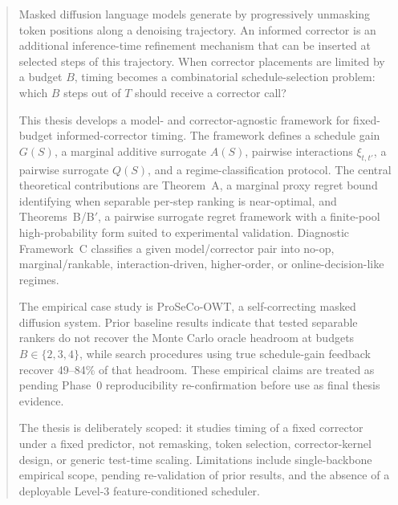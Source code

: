 \begin{abstract}
Masked diffusion language models generate by progressively unmasking token
positions along a denoising trajectory. An informed corrector is an additional
inference-time refinement mechanism that can be inserted at selected steps of
this trajectory. When corrector placements are limited by a budget $B$, timing
becomes a combinatorial schedule-selection problem: which $B$ steps out of $T$
should receive a corrector call?

This thesis develops a model- and corrector-agnostic framework for fixed-budget
informed-corrector timing. The framework defines a schedule gain $G(S)$, a
marginal additive surrogate $A(S)$, pairwise interactions $\xi_{t,t'}$, a
pairwise surrogate $Q(S)$, and a regime-classification protocol. The central
theoretical contributions are Theorem~A, a marginal proxy regret bound
identifying when separable per-step ranking is near-optimal, and
Theorems~B/B$'$, a pairwise surrogate regret framework with a finite-pool
high-probability form suited to experimental validation. Diagnostic
Framework~C classifies a given model/corrector pair into no-op,
marginal/rankable, interaction-driven, higher-order, or online-decision-like
regimes.

The empirical case study is ProSeCo-OWT, a self-correcting masked diffusion
system. Prior baseline results indicate that tested separable rankers do not
recover the Monte Carlo oracle headroom at budgets $B\in\{2,3,4\}$, while
search procedures using true schedule-gain feedback recover 49--84\% of
that headroom. These empirical claims are treated as pending Phase~0
reproducibility re-confirmation before use as final thesis evidence.

The thesis is deliberately scoped: it studies timing of a fixed corrector
under a fixed predictor, not remasking, token selection, corrector-kernel
design, or generic test-time scaling. Limitations include single-backbone
empirical scope, pending re-validation of prior results, and the absence of
a deployable Level-3 feature-conditioned scheduler.
\end{abstract}
\newpage
